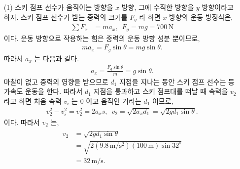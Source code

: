 \documentclass[floatfix,nofootinbib,superscriptaddress,fleqn]{revtex4-2}
\begin{document}
\begin{itemize}
  \item[(1)] 스키 점프 선수가 움직이는 방향을 $x$ 방향, 
  그에 수직한 방향을 $y$ 방향이라고 하자.
   스키 점프 선수가 받는 중력의 크기를 $F_g$ 라 하면 $x$ 방향의 운동 방정식은,
  \begin{align}
      \sum F_x &= ma_x,\,\,\,F_g = mg = 700\,\mathrm{N}
  \end{align}
  이다. 운동 방향으로 작용하는 힘은 중력의 운동 방향 성분 뿐이므로,
  \begin{align}
    ma_x=F_g\sin{\theta} = mg\sin{\theta}.
  \end{align}
  따라서 $a_x$ 는 다음과 같다.
  \begin{align}
    a_x = \frac{F_g\sin{\theta}}{m}=g\sin{\theta}.
  \end{align}
  마찰이 없고 중력의 영향을 받으므로 $d_1$ 지점을 지나는 동안
  스키 점프 선수는 등가속도 운동을 한다. 따라서 $d_1$ 지점을 통과하고 
  스키 점프대를 떠날 때 속력을 $v_2$ 라고 하면 처음 속력 $v_i$ 는 0 이고 
  움직인 거리는 $d_1$ 이므로,
  \begin{align}
    v_2^2-v_i^2 = v_2^2 = 2a_x s,\,\,\, v_2 
    = \sqrt{2a_x d_1}= \sqrt{2g d_1\sin{\theta}}.
  \end{align} 
  이다. 따라서 $v_2$ 는,
  \begin{align}
    \begin{split}
      v_2 &= \sqrt{2g d_1\sin{\theta}} \\
      &= \sqrt{2(9.8\,\mathrm{m/s^2})(100\,\mathrm{m})\sin{32^\circ}}  \\
      &= 32\,\mathrm{m/s}.
    \end{split}
  \end{align}
  

\end{itemize}
\end{document}
